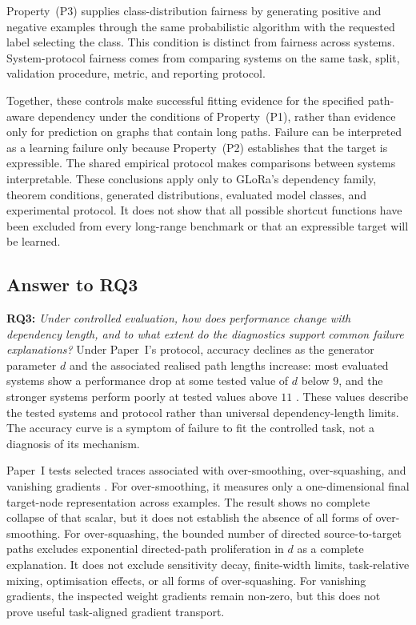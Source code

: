 Property~(P3) supplies class-distribution fairness by generating positive and negative examples through the same probabilistic algorithm with the requested label selecting the class.
This condition is distinct from fairness across systems.
System-protocol fairness comes from comparing systems on the same task, split, validation procedure, metric, and reporting protocol.

Together, these controls make successful fitting evidence for the specified path-aware dependency under the conditions of Property~(P1), rather than evidence only for prediction on graphs that contain long paths.
Failure can be interpreted as a learning failure only because Property~(P2) establishes that the target is expressible.
The shared empirical protocol makes comparisons between systems interpretable.
These conclusions apply only to GLoRa's dependency family, theorem conditions, generated distributions, evaluated model classes, and experimental protocol.
It does not show that all possible shortcut functions have been excluded from every long-range benchmark or that an expressible target will be learned.

\subsection{Answer to RQ3}

\noindent\textbf{RQ3:} \emph{Under controlled evaluation, how does performance change with dependency length, and to what extent do the diagnostics support common failure explanations?}
Under Paper~I's protocol, accuracy declines as the generator parameter $d$ and the associated realised path lengths increase: most evaluated systems show a performance drop at some tested value of $d$ below $9$, and the stronger systems perform poorly at tested values above $11$ \cite{zhou2025glora}.
These values describe the tested systems and protocol rather than universal dependency-length limits.
The accuracy curve is a symptom of failure to fit the controlled task, not a diagnosis of its mechanism.

Paper~I tests selected traces associated with over-smoothing, over-squashing, and vanishing gradients \cite{li2018deeper,alon2021bottleneck,glorot2010difficulty,zhou2025glora}.
For over-smoothing, it measures only a one-dimensional final target-node representation across examples.
The result shows no complete collapse of that scalar, but it does not establish the absence of all forms of over-smoothing.
For over-squashing, the bounded number of directed source-to-target paths excludes exponential directed-path proliferation in $d$ as a complete explanation.
It does not exclude sensitivity decay, finite-width limits, task-relative mixing, optimisation effects, or all forms of over-squashing.
For vanishing gradients, the inspected weight gradients remain non-zero, but this does not prove useful task-aligned gradient transport.

